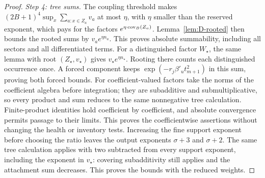 \begin{proof}
\emph{Step 4: tree sums.} The coupling threshold makes $(2B+1)^4\sup_x\sum_{a:x\in Z_a}v_a$ at most $\eta$, with $\eta$ smaller than the reserved exponent, which pays for the factors $e^{\eta\operatorname{cov}_B(Z_a)}$. Lemma~\ref{lem:D-rooted} then bounds the rooted sums by $v_ae^{\eta n_a}$. This proves absolute summability, including all sectors and all differentiated terms. For a distinguished factor $W_\star$, the same lemma with root $(Z_\star,v_\star)$ gives $v_\star e^{\eta n_\star}$. Rooting there counts each distinguished occurrence once. A forced component keeps $\exp(-r_j\beta'_u t_{m+1}^2)$ in this sum, proving both forced bounds. For coefficient-valued factors take the norms of the coefficient algebra before integration; they are subadditive and submultiplicative, so every product and sum reduces to the same nonnegative tree calculation. Finite-product identities hold coefficient by coefficient, and absolute convergence permits passage to their limits. This proves the coefficientwise assertions without changing the health or inventory tests. Increasing the fine support exponent before choosing the ratio leaves the output exponents $\sigma+3$ and $\sigma+2$. The same tree calculation applies with two subtracted from every support exponent, including the exponent in $v_\star$: covering subadditivity still applies and the attachment sum decreases. This proves the bounds with the reduced weights.


\end{proof}
